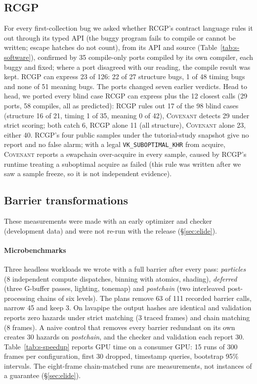 \documentclass[acmtog,anonymous,review]{acmart}
\newcommand{\sys}{\textsc{Covenant}\xspace}
\newcommand{\rcgp}{RCGP\xspace}
\newcommand{\code}[1]{\texttt{#1}}
\begin{document}
\subsection{\rcgp}
\label{sup:rcgp}
For every first-collection bug we asked whether \rcgp's contract language rules it out through its typed API (the buggy
program fails to compile or cannot be written; escape hatches do not count), from its API and source (Table~\ref{tab:s-software}), confirmed by 35 compile-only ports compiled by its own compiler, each buggy and fixed; where a port
disagreed with our reading, the compile result was kept. \rcgp can express 23 of 126: 22 of 27 structure bugs, 1 of 48
timing bugs and none of 51 meaning bugs. The ports changed seven earlier verdicts. Head to head, we ported every blind
case \rcgp can express plus the 12 closest calls (29 ports, 58 compiles, all as predicted): \rcgp rules out 17 of the 98
blind cases (structure 16 of 21, timing 1 of 35, meaning 0 of 42), \sys detects 29 under strict scoring; both catch 6,
\rcgp alone 11 (all structure), \sys alone 23, either 40. \rcgp's four public samples under the tutorial-study snapshot give no report and no false
alarm; with a legal \code{VK\_SUBOPTIMAL\_KHR} from acquire, \sys reports a swapchain over-acquire in every sample, caused
by \rcgp's runtime treating a suboptimal acquire as failed (this rule was written after we saw a sample freeze, so it is
not independent evidence).

\subsection{Barrier transformations}
\label{sec:eval-elide}
These measurements were made with an early optimizer and checker (development data) and were not re-run with the
release (\S\ref{sec:elide}).

\paragraph{Microbenchmarks}
Three headless workloads we wrote with a full barrier after every pass: \emph{particles} (8 independent compute
dispatches, binning with atomics, shading), \emph{deferred} (three G-buffer passes, lighting, tonemap) and
\emph{postchain} (two interleaved post-processing chains of six levels). The plans remove 63 of 111 recorded barrier
calls, narrow 45 and keep 3. On lavapipe the output hashes are identical and validation reports zero hazards under
strict matching (3 traced frames) and chain matching (8 frames). A naive control that removes every barrier redundant
on its own creates 30 hazards on \emph{postchain}, and the checker and validation each report 30.
Table~\ref{tab:s-speedup} reports GPU time on a consumer GPU: 15 runs of 300 frames per configuration, first 30 dropped,
timestamp queries, bootstrap 95\% intervals. The eight-frame chain-matched runs are measurements, not instances of a
guarantee (\S\ref{sec:elide}).
\end{document}
